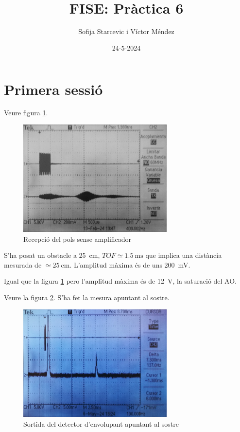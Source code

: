 \documentclass[catalan, a4paper, nobib]{tufte-handout}
\author{Sofija Starcevic i Víctor Méndez}
\title{FISE: Pràctica 6}
\date{24-5-2024}
\begin{document}
\maketitle

\part{Primera sessió}

 Veure figura \ref{fig:1_1}.

\begin{figure}
  \begin{center}
    \includegraphics[width=295px]{1_1.png}
  \end{center}
  \caption{Recepció del pols sense amplificador}
  \label{fig:1_1}
\end{figure}

 S'ha posat un obstacle a \qty{25}{\centi\meter}, $TOF\simeq\qty{1.5}{\milli\second}$ que implica una distància mesurada de $\simeq\qty{25}{\centi\meter}$. L'amplitud màxima és de uns \qty{200}{\milli\volt}.

 Igual que la figura \ref{fig:1_1} pero l'amplitud màxima és de \qty{12}{\volt}, la saturació del AO.

 Veure la figura \ref{fig:1_4}. S'ha fet la mesura apuntant al sostre.

\begin{figure}
  \begin{center}
    \includegraphics[width=295px]{1_4.png}
  \end{center}
  \caption{Sortida del detector d'envolupant apuntant al sostre}
  \label{fig:1_4}
\end{figure}
\end{document}
